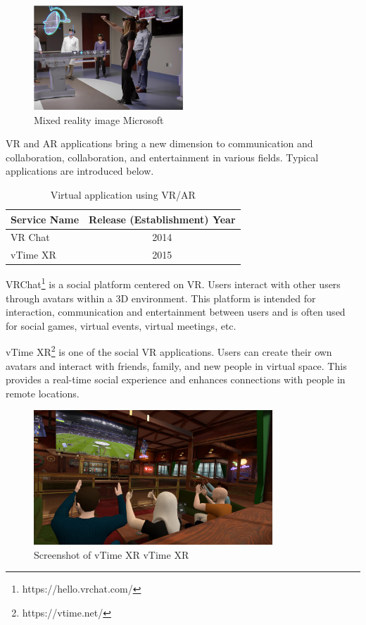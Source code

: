 \documentclass[12pt]{article}
\begin{document}
\begin{figure}[H]
    \centering
    \includegraphics[width=0.5\textwidth]{vrexample.jpg}
    \caption{Mixed reality image \textcopyright Microsoft}
    \label{fig:my_label}
\end{figure}

VR and AR applications bring a new dimension to communication and
collaboration, collaboration, and entertainment in various
fields. Typical applications are introduced below.

\begin{table}[h]
    \begin{center}
        \begin{tabular}{|l|c|} \hline
            Service Name & Release (Establishment) Year \\ \hline
            VR Chat      & 2014                         \\
            vTime XR     & 2015                         \\ \hline
        \end{tabular}
        \caption{Virtual application using VR/AR}
    \end{center}
\end{table}

VRChat\footnote{https://hello.vrchat.com/} is a social platform centered on VR.
Users interact with other users
through avatars within a 3D environment. This platform is intended for
interaction, communication and entertainment between users and is often used
for social games, virtual events, virtual meetings, etc.

vTime XR\footnote{https://vtime.net/} is one of the social VR applications.
Users can create their own
avatars and interact with friends, family, and new people in virtual space.
This provides a real-time social experience and enhances connections with
people in remote locations.

\begin{figure}[H]
    \centering
    \includegraphics[width=0.8\textwidth]{vtimexr.png}
    \caption{Screenshot of vTime XR \textcopyright vTime XR}
    \label{fig:my_label}
\end{figure}
\end{document}
